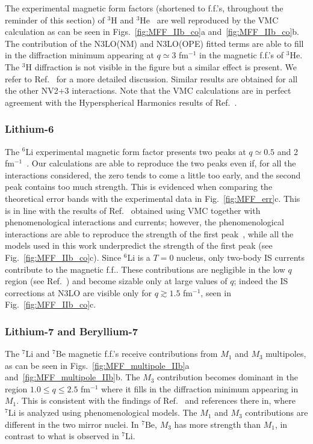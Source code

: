 \documentclass[aps,prc,floatfix,showpacs,twocolumn, preprintnumbers]{revtex4-2}
\newcommand{\het}{{}^3\text{He}}
\newcommand{\tri}{{}^3\text{H}}
\newcommand{\lisix}{{}^6\text{Li}}
\newcommand{\lisev}{{}^7\text{Li}}
\newcommand{\besev}{{}^7\text{Be}}
\begin{document}
The experimental magnetic form factors (shortened to f.f.'s, throughout the reminder of this section) of $\tri$
and $\het$~\cite{Amroun:1994qj, Sick2001} are well reproduced by the VMC calculation as can be seen in Figs.~\ref{fig:MFF_IIb_co}a and~\ref{fig:MFF_IIb_co}b.  The contribution of the N3LO(NM) and N3LO(OPE) fitted terms are able to fill in the diffraction minimum appearing at $q\simeq3$ fm$^{-1}$ in the magnetic f.f.'s of $\het$. The $\tri$ diffraction is not visible in the figure but a similar effect is present. We refer to Ref.~\cite{Gnech:2022vwr} for a more detailed discussion. 
Similar results are obtained for all the other NV2+3 interactions.
Note that the VMC calculations are in perfect agreement with the Hyperspherical Harmonics results of Ref.~\cite{Gnech:2022vwr}.


\subsubsection{Lithium-6}

 The $\lisix$ experimental magnetic form factor presents two peaks at $q\simeq0.5$ and 2 fm$^{-1}$~\cite{Peterson1962,Goldemberg1963, Rand1966,Lapikas1978,Bergstrom1982}. Our calculations are able to reproduce the two peaks even if, for all the interactions considered, the zero tends to come a little too early,  and the second peak contains too much strength. This is evidenced when comparing the theoretical error bands with the experimental data in Fig.~\ref{fig:MFF_err}c. This is in line with the results of Ref.~\cite{Wiringa:1998hr} obtained using  VMC together with phenomenological interactions and currents; however, the phenomenological interactions are able to reproduce the strength of the first peak~\cite{Wiringa:1998hr}, while all the models used in this work underpredict the strength of the first peak (see Fig.~\ref{fig:MFF_IIb_co}c). Since $^6$Li is a $T=0$ nucleus, only two-body IS currents contribute to the magnetic f.f.. These contributions are negligible in the low $q$ region (see Ref.~\cite{Donnelly1984,Wiringa:1998hr}) and become sizable only at large values of $q$; indeed the IS corrections at N3LO are visible only for $q\gtrsim1.5$ fm$^{-1}$, seen in Fig.~\ref{fig:MFF_IIb_co}c. 

\subsubsection{Lithium-7 and Beryllium-7} 

The $\lisev$ and $\besev$ magnetic f.f.'s receive contributions from $M_1$ and $M_3$ multipoles, as can be seen in Figs.~\ref{fig:MFF_multipole_IIb}a and~\ref{fig:MFF_multipole_IIb}b. The $M_3$ contribution becomes dominant in the region $1.0\leq q \leq 2.5$ fm$^{-1}$ where it fills in the diffraction minimum appearing in $M_1$. This is consistent with the findings of Ref.~\cite{Donnelly1984} and references there in, where $\lisev$ is analyzed using phenomenological models. The $M_1$ and $M_3$ contributions are different in the two mirror nuclei. In $\besev$, $M_3$ has more strength than $M_1$, in contrast to what is observed in $\lisev$.
\end{document}
